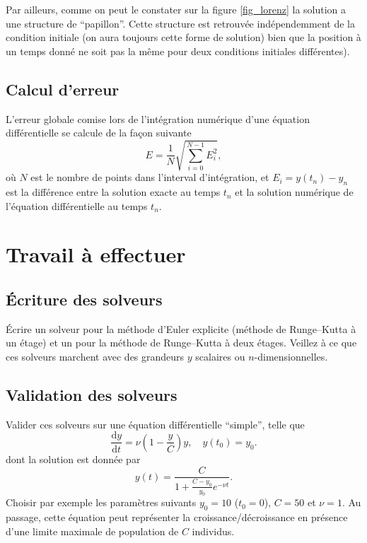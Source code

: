 \documentclass[a4paper,10pt]{article}
\newcommand{\dd}{\mathrm{d}}
\begin{document}
Par ailleurs, comme on peut le constater sur la figure \ref{fig_lorenz} la solution a une structure de ``papillon''. 
Cette structure est retrouvée indépendemment de la condition initiale (on aura toujours cette forme de solution)
bien que la position à un temps donné ne soit pas la même pour deux conditions initiales différentes).

\subsection*{Calcul d'erreur}

L'erreur globale comise lors de l'intégration numérique d'une équation différentielle se calcule 
de la façon suivante
\begin{equation}
 E=\frac{1}{N}\sqrt{\sum_{i=0}^{N-1} E_i^2},
\end{equation}
où $N$ est le nombre de points dans l'interval d'intégration, 
et $E_i=y(t_n)-y_{n}$ est la différence entre la solution exacte au temps $t_n$ et la solution numérique 
de l'équation différentielle au temps $t_n$.


\section*{Travail à effectuer}

\subsection*{Écriture des solveurs}

Écrire un solveur pour la méthode d'Euler explicite (méthode de Runge--Kutta à
un étage) et un pour la méthode de Runge--Kutta à deux étages. Veillez à ce que ces solveurs 
marchent avec des grandeurs $y$ scalaires ou $n$-dimensionnelles. 

\subsection*{Validation des solveurs}
Valider ces solveurs sur une équation différentielle ``simple'', telle que
\begin{equation*}
 \frac{\dd y}{\dd t}=\nu\left(1-\frac{y}{C}\right)y,\quad y(t_0)=y_0.
\end{equation*}
dont la solution est donnée par 
\begin{equation*}
 y(t)=\frac{C}{1+\frac{C-y_0}{y_0}e^{-\nu t}}.
\end{equation*}
Choisir par exemple les paramètres suivants $y_0=10$ ($t_0=0$), $C=50$ et $\nu=1$. Au passage, cette équation 
peut représenter la croissance/décroissance en présence d'une limite maximale de population de $C$ individus.
\end{document}
